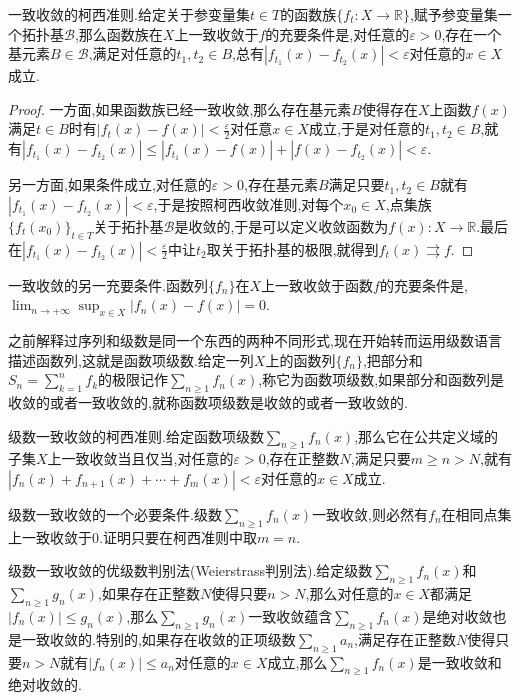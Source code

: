 一致收敛的柯西准则.给定关于参变量集$t\in T$的函数族$\{f_t:X\to\mathbb{R}\}$,赋予参变量集一个拓扑基$\mathscr{B}$,那么函数族在$X$上一致收敛于$f$的充要条件是,对任意的$\varepsilon>0$,存在一个基元素$B\in\mathscr{B}$,满足对任意的$t_1,t_2\in B$,总有$|f_{t_1}(x)-f_{t_2}(x)|<\varepsilon$对任意的$x\in X$成立.
\begin{proof}
	
	一方面,如果函数族已经一致收敛,那么存在基元素$B$使得存在$X$上函数$f(x)$满足$t\in B$时有$|f_t(x)-f(x)|<\frac{\varepsilon}{2}$对任意$x\in X$成立,于是对任意的$t_1,t_2\in B$,就有$|f_{t_1}(x)-f_{t_2}(x)|\le|f_{t_1}(x)-f(x)|+|f(x)-f_{t_2}(x)|<\varepsilon$.
	
	另一方面,如果条件成立,对任意的$\varepsilon>0$,存在基元素$B$满足只要$t_1,t_2\in B$就有$|f_{t_1}(x)-f_{t_2}(x)|<\varepsilon$,于是按照柯西收敛准则,对每个$x_0\in X$,点集族$\{f_t(x_0)\}_{t\in T}$关于拓扑基$\mathscr{B}$是收敛的,于是可以定义收敛函数为$f(x):X\to\mathbb{R}$.最后在$|f_{t_1}(x)-f_{t_2}(x)|<\frac{\varepsilon}{2}$中让$t_2$取关于拓扑基的极限,就得到$f_t(x)\rightrightarrows f$.
	
\end{proof}

一致收敛的另一充要条件.函数列$\{f_n\}$在$X$上一致收敛于函数$f$的充要条件是,$\lim_{n\to+\infty}\sup_{x\in X}|f_n(x)-f(x)|=0$.

之前解释过序列和级数是同一个东西的两种不同形式,现在开始转而运用级数语言描述函数列,这就是函数项级数.给定一列$X$上的函数列$\{f_n\}$,把部分和$S_n=\sum_{k=1}^{n}f_k$的极限记作$\sum_{n\ge1}f_n(x)$,称它为函数项级数,如果部分和函数列是收敛的或者一致收敛的,就称函数项级数是收敛的或者一致收敛的.

级数一致收敛的柯西准则.给定函数项级数$\sum_{n\ge1}f_n(x)$,那么它在公共定义域的子集$X$上一致收敛当且仅当,对任意的$\varepsilon>0$,存在正整数$N$,满足只要$m\ge n>N$,就有$|f_n(x)+f_{n+1}(x)+\cdots+f_m(x)|<\varepsilon$对任意的$x\in X$成立.

级数一致收敛的一个必要条件.级数$\sum_{n\ge1}f_n(x)$一致收敛,则必然有$f_n$在相同点集上一致收敛于0.证明只要在柯西准则中取$m=n$.

级数一致收敛的优级数判别法(Weierstrass判别法).给定级数$\sum_{n\ge1}f_n(x)$和$\sum_{n\ge1}g_n(x)$,如果存在正整数$N$使得只要$n>N$,那么对任意的$x\in X$都满足$|f_n(x)|\le g_n(x)$,那么$\sum_{n\ge1}g_n(x)$一致收敛蕴含$\sum_{n\ge1}f_n(x)$是绝对收敛也是一致收敛的.特别的,如果存在收敛的正项级数$\sum_{n\ge1}a_n$,满足存在正整数$N$使得只要$n>N$就有$|f_n(x)|\le a_n$对任意的$x\in X$成立,那么$\sum_{n\ge1}f_n(x)$是一致收敛和绝对收敛的.

